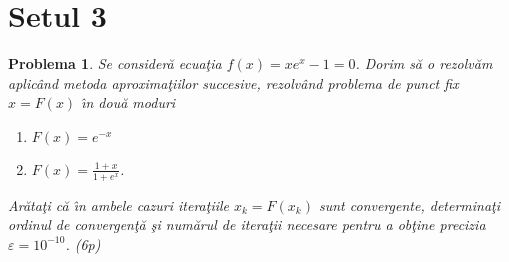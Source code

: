 \documentclass{article}%
\newtheorem{problem}[theorem]{Problema}
\begin{document}
\section*{Setul 3}

\begin{problem}
Se consider\u{a} ecua\c{t}ia $f(x)=xe^{x}-1=0$. Dorim s\u{a} o rezolv\u{a}m
aplic\^{a}nd metoda aproxima\c{t}iilor succesive, rezolv\^{a}nd problema de
punct fix $x=F(x)$ \^{\i}n dou\u{a} moduri

\begin{enumerate}
\item[(a)] $F(x)=e^{-x}$

\item[(b)] $F(x)=\frac{1+x}{1+e^{x}}$.
\end{enumerate}

Ar\u{a}ta\c{t}i c\u{a} \^{\i}n ambele cazuri itera\c{t}iile $x_{k}=F(x_{k})$
sunt convergente, determina\c{t}i ordinul de convergen\c{t}\u{a} \c{s}i
num\u{a}rul de itera\c{t}ii necesare pentru a ob\c{t}ine precizia
$\varepsilon=10^{-10}$. (6p)
\end{problem}
\end{document}
